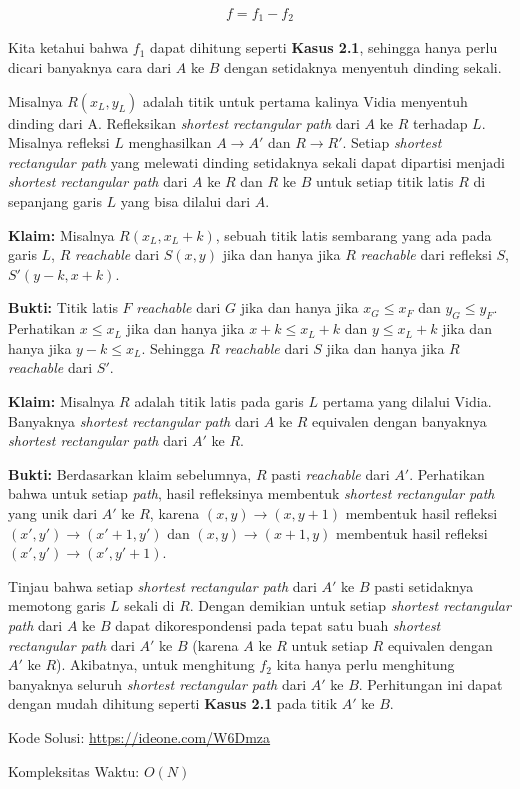 \documentclass{article}
\begin{document}
\begin{align*} 
    f = f_1 - f_2
\end{align*}

Kita ketahui bahwa $f_1$ dapat dihitung seperti \textbf{Kasus 2.1}, sehingga hanya perlu dicari banyaknya cara dari $A$ ke $B$ dengan setidaknya menyentuh dinding sekali.

Misalnya $R(x_L, y_L)$ adalah titik untuk pertama kalinya Vidia menyentuh dinding dari A.
Refleksikan \textit{shortest rectangular path} dari $A$ ke $R$ terhadap $L$. Misalnya refleksi $L$ menghasilkan $A \xrightarrow{} A'$ dan $R \xrightarrow{} R'$.  Setiap \textit{shortest rectangular path} yang melewati dinding setidaknya sekali dapat dipartisi menjadi \textit{shortest rectangular path} dari $A$ ke $R$ dan $R$ ke $B$ untuk setiap titik latis $R$ di sepanjang garis $L$ yang bisa dilalui dari $A$. 

\textbf{Klaim:} Misalnya $R(x_L, x_L+k)$, sebuah titik latis sembarang yang ada pada garis $L$, $R$ \textit{reachable} dari $S(x, y)$ jika dan hanya jika $R$ \textit{reachable} dari refleksi $S$, $S'(y-k, x+k)$. 

\textbf{Bukti:} Titik latis $F$ \textit{reachable} dari $G$ jika dan hanya jika $x_G \leq x_F$ dan $y_G \leq y_F$. Perhatikan $x \leq x_L$ jika dan hanya jika $x + k \leq x_L + k$ dan $y \leq x_L + k$ jika dan hanya jika $y - k \leq x_L$. Sehingga $R$ \textit{reachable} dari $S$ jika dan hanya jika $R$ \textit{reachable} dari $S'$.

\textbf{Klaim:} Misalnya $R$ adalah titik latis pada garis $L$ pertama yang dilalui Vidia. Banyaknya \textit{shortest rectangular path} dari $A$ ke $R$ equivalen dengan banyaknya \textit{shortest rectangular path} dari $A'$ ke $R$. 

\textbf{Bukti:} Berdasarkan klaim sebelumnya, $R$ pasti \textit{reachable} dari $A'$. Perhatikan bahwa untuk setiap \textit{path}, hasil refleksinya membentuk \textit{shortest rectangular path} yang unik dari $A'$ ke $R$, karena $(x, y)\xrightarrow{}(x, y+1)$ membentuk hasil refleksi $(x', y')\xrightarrow{}(x'+1, y')$ dan $(x, y)\xrightarrow{}(x+1, y)$ membentuk hasil refleksi $(x', y')\xrightarrow{}(x', y'+1)$.

Tinjau bahwa setiap \textit{shortest rectangular path} dari $A'$ ke $B$ pasti setidaknya memotong garis $L$ sekali di $R$. Dengan demikian untuk setiap \textit{shortest rectangular path} dari $A$ ke $B$ dapat dikorespondensi pada tepat satu buah \textit{shortest rectangular path} dari $A'$ ke $B$ (karena $A$ ke $R$ untuk setiap $R$ equivalen dengan $A'$ ke $R$). Akibatnya, untuk menghitung $f_2$ kita hanya perlu menghitung banyaknya seluruh \textit{shortest rectangular path} dari $A'$ ke $B$. Perhitungan ini dapat dengan mudah dihitung seperti \textbf{Kasus 2.1} pada titik $A'$ ke $B$.


Kode Solusi: \url{https://ideone.com/W6Dmza}

Kompleksitas Waktu: $O(N)$
\end{document}
